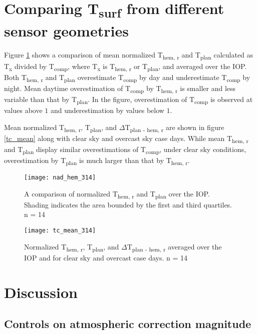 \section{Comparing T\textsubscript{surf} from different sensor geometries}

Figure \ref{tc_nadhem} shows a comparison of mean normalized T\textsubscript{hem, r} and T\textsubscript{plan} calculated as T\textsubscript{x} divided by T\textsubscript{comp}, where T\textsubscript{x} is T\textsubscript{hem, r} or T\textsubscript{plan}, and averaged over the IOP. Both T\textsubscript{hem, r} and T\textsubscript{plan} overestimate T\textsubscript{comp} by day and underestimate T\textsubscript{comp} by night. Mean daytime overestimation of T\textsubscript{comp} by T\textsubscript{hem, r} is smaller and less variable than that by T\textsubscript{plan}. In the figure, overestimation of T\textsubscript{comp} is observed at values above $1$ and underestimation by values below $1$.

Mean normalized T\textsubscript{hem, r}, T\textsubscript{plan}, and $\Delta$T\textsubscript{plan - hem, r} are shown in figure \ref{tc_mean} along with clear sky and overcast sky case days. While mean T\textsubscript{hem, r} and T\textsubscript{plan} display similar overestimations of T\textsubscript{comp}, under clear sky conditions, overestimation by T\textsubscript{plan} is much larger than that by T\textsubscript{hem, r}.

\begin{figure}[H]
	\centering
	\texttt{[image: nad\_hem\_314]}
	\caption{A comparison of normalized T\textsubscript{hem, r} and T\textsubscript{plan} over the IOP. Shading indicates the area bounded by the first and third quartiles. n = 14}
	\label{tc_nadhem}
\end{figure}

\begin{figure}[H]
	\centering
	\texttt{[image: tc\_mean\_314]}
	\caption{Normalized T\textsubscript{hem, r}, T\textsubscript{plan}, and $\Delta$T\textsubscript{plan - hem, r} averaged over the IOP and for clear sky and overcast case days. n = 14}
	\label{tc_mean2}
\end{figure}

\section{Discussion}

\subsection{Controls on atmospheric correction magnitude}

